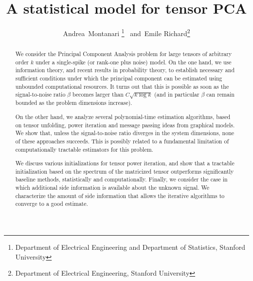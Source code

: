 \documentclass[11pt]{article}
\author{Andrea~Montanari \footnote{Department of Electrical
    Engineering and Department of Statistics, Stanford University}
\, and\, Emile Richard\footnote{Department of Electrical
    Engineering, Stanford University}}
\title{A statistical model for tensor PCA}
\theoremstyle{definition}
\begin{document}
\maketitle

\begin{abstract}
We consider the Principal Component Analysis problem for large tensors
of arbitrary order $k$ under a single-spike (or rank-one plus noise)
model.
On the one hand, we use information theory, and recent results in
probability theory, to establish necessary and sufficient conditions
under  which the principal component can be estimated using unbounded
computational resources. It turns out that this is possible as soon as
the signal-to-noise ratio $\beta$ becomes larger than $C\sqrt{k\log k}$ (and
in particular $\beta$ can remain bounded as the problem dimensions increase).

On the other hand, we analyze several polynomial-time estimation
algorithms, based on tensor unfolding, power iteration and message
passing ideas from graphical
models.  We show that, unless the signal-to-noise ratio diverges in
the system dimensions, none of these approaches succeeds. This is
possibly related to a fundamental limitation of computationally
tractable estimators for this problem.

We discuss various initializations for tensor power iteration, and show that a tractable initialization based on the spectrum of the matricized  tensor outperforms
significantly  baseline methods, statistically and computationally. Finally, we consider the case in
which additional side information is available about the unknown
signal.
We characterize the amount of side information that allows the
iterative algorithms to converge to a good estimate. 
\end{abstract}
\end{document}
